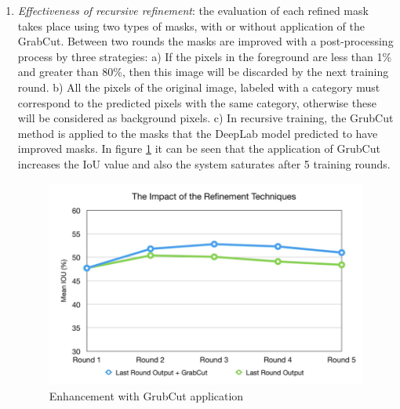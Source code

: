 \begin{enumerate}
    \item \emph{Effectiveness of recursive refinement}: the evaluation of each refined 
    mask takes place using two types of masks, with or without application 
    of the GrabCut. Between two rounds the masks are improved 
    with a post-processing process by three strategies: a) If the pixels in 
    the foreground are less than 1\% and greater than 80\%, then this image 
    will be discarded by the next training round. b) All the pixels 
    of the original image, labeled with a category must correspond to the 
    predicted pixels with the same category, otherwise these will be considered 
    as background pixels. c) In recursive training, the GrubCut 
    method is applied to the masks that the DeepLab model predicted to 
    have improved masks. In figure \ref{fig:GrubCutApp} it can be seen that the application 
    of GrubCut increases the IoU value and also the system saturates after 
    5 training rounds.
    \begin{figure}[h!]
        \centering
        \includegraphics[width = 0.8 \linewidth]{images/paper6/GrabCut.png}
        \centering
        \caption{Enhancement with GrubCut application}
        \label{fig:GrubCutApp}
    \end{figure}


\end{enumerate}
